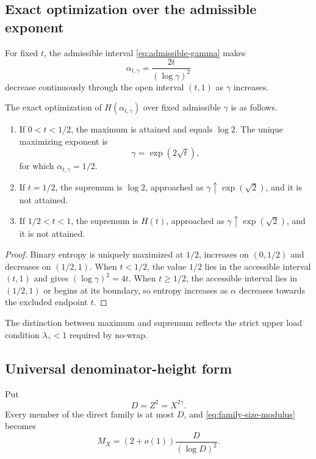 \subsection{Exact optimization over the admissible exponent}

For fixed $t$, the admissible interval \cref{eq:admissible-gamma} makes
\[
 \alpha_{t,\gamma}=\frac{2t}{(\log\gamma)^2}
\]
decrease continuously through the open interval $(t,1)$ as $\gamma$ increases.

\begin{theorem}
\label{thm:entropy-optimization}
The exact optimization of $H(\alpha_{t,\gamma})$ over fixed admissible $\gamma$ is as follows.
\begin{enumerate}[label=(\roman*)]
\item If $0<t<1/2$, the maximum is attained and equals $\log2$.  The unique maximizing exponent is
\begin{equation}
\label{eq:optimal-gamma}
 \gamma=\exp(2\sqrt t),
\end{equation}
for which $\alpha_{t,\gamma}=1/2$.
\item If $t=1/2$, the supremum is $\log2$, approached as $\gamma\uparrow\exp(\sqrt2)$, and it is not attained.
\item If $1/2<t<1$, the supremum is $H(t)$, approached as $\gamma\uparrow\exp(\sqrt2)$, and it is not attained.
\end{enumerate}
\end{theorem}

\begin{proof}
Binary entropy is uniquely maximized at $1/2$, increases on $(0,1/2)$ and decreases on $(1/2,1)$.  When $t<1/2$, the value $1/2$ lies in the accessible interval $(t,1)$ and gives $(\log\gamma)^2=4t$.  When $t\geq1/2$, the accessible interval lies in $(1/2,1)$ or begins at its boundary, so entropy increases as $\alpha$ decreases towards the excluded endpoint $t$.
\end{proof}

The distinction between maximum and supremum reflects the strict upper load condition $\lambda_\gamma<1$ required by no-wrap.

\subsection{Universal denominator-height form}

Put
\begin{equation}
\label{eq:D-height}
 D=Z^2=X^{2\gamma}.
\end{equation}
Every member of the direct family is at most $D$, and \cref{eq:family-size-modulus} becomes
\begin{equation}
\label{eq:M-height}
 M_X=(2+o(1))\frac{D}{(\log D)^2}.
\end{equation}


